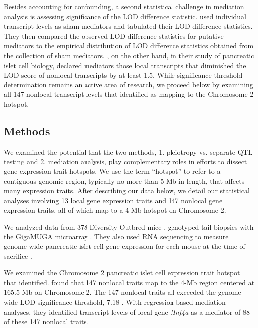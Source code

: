 \documentclass[oneside]{book}\usepackage[]{graphicx}\usepackage[]{color}
\begin{document}
Besides accounting for confounding, a second statistical challenge in mediation analysis is assessing significance of the LOD difference statistic. 
\citet{chick2016defining} used individual transcript levels as sham mediators and tabulated their LOD difference statistics. 
They then compared the observed LOD difference statistics for putative mediators to the empirical distribution of LOD difference statistics obtained from the collection of sham mediators. 
\citet{keller2018genetic}, on the other hand, in their study of pancreatic islet 
cell biology, declared mediators those local transcripts that diminished the LOD score 
of nonlocal transcripts by at least 1.5. 
While significance threshold determination remains an active area of research, 
we proceed below by examining all 147 nonlocal transcript levels that 
\citet{keller2018genetic} identified as mapping to the Chromosome 2 hotspot.



\subsection{Methods}

We examined the potential that the two methods, 1. pleiotropy vs. separate QTL testing and 
2. mediation analysis, play complementary roles in efforts to dissect gene expression trait hotspots. 
We use the term ``hotspot'' to refer to a contiguous genomic region, 
typically no more than 5 Mb in length, that affects many expression traits.
After describing our data below, we detail our statistical analyses involving 13 local 
gene expression traits and 147 nonlocal gene expression traits, 
all of which map to a 4-Mb hotspot on Chromosome 2.


We analyzed data from 378 Diversity Outbred mice \citep{keller2018genetic}. 
\citet{keller2018genetic} genotyped tail biopsies with the GigaMUGA microarray \citep{morgan2015mouse}. 
They also used RNA sequencing to measure genome-wide pancreatic islet cell gene expression 
for each mouse at the time of sacrifice \citep{keller2018genetic}. 

We examined the Chromosome 2 pancreatic islet cell expression trait hotspot that \citet{keller2018genetic} identified. 
\citet{keller2018genetic} found that 147 nonlocal traits map to the 4-Mb region 
centered at 165.5 Mb on Chromosome 2.
The 147 nonlocal traits all exceeded the genome-wide LOD significance threshold, 
7.18 \citep{keller2018genetic}. 
With regression-based mediation analyses, they identified transcript levels of local gene \emph{Hnf4a} as a mediator of 88 of these 147 nonlocal traits.
\end{document}
